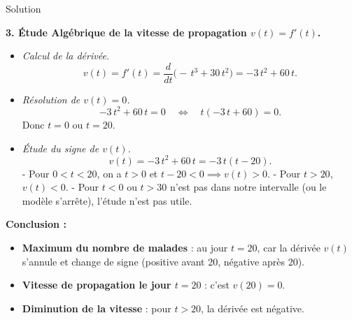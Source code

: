\documentclass[a4paper,12pt]{article}
\begin{document}
\begin{solutionbox}{Solution}
\bigskip

\textbf{3. Étude Algébrique de la vitesse de propagation $v(t) = f'(t)$.}

\begin{itemize}
  \item \textit{Calcul de la dérivée.}  
    $$
    v(t)=f'(t)= \frac{d}{dt}\bigl(-\,t^3 +30\,t^2\bigr)= -3\,t^2 +60\,t.
    $$

  \item \textit{Résolution de $v(t)=0$.}  
    $$
    -3\,t^2 +60\,t=0 \quad\Longleftrightarrow\quad t(-3\,t+60)=0.
    $$
    Donc $t=0$ ou $t=20.$

  \item \textit{Étude du signe de $v(t)$.}  
    \[
    v(t)= -3\,t^2 +60\,t= -3\,t(t-20).
    \]
    - Pour $0<t<20$, on a $t>0$ et $t-20<0\implies v(t)>0$.  
    - Pour $t>20$, $v(t)<0$.  
    - Pour $t<0$ ou $t>30$ n’est pas dans notre intervalle (ou le modèle s’arrête), l’étude n’est pas utile.

\end{itemize}

\textbf{Conclusion :}

\begin{itemize}
  \item \textbf{Maximum du nombre de malades} : au jour $t=20$, car la dérivée $v(t)$ s’annule et change de signe (positive avant 20, négative après 20).  
  \item \textbf{Vitesse de propagation le jour $t=20$} : c’est $v(20)=0.$  
  \item \textbf{Diminution de la vitesse} : pour $t>20$, la dérivée est négative.  
\end{itemize}

\end{solutionbox}
\end{document}
